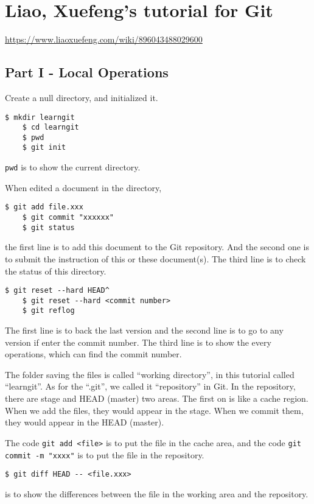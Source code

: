 \chapter{Liao, Xuefeng's tutorial for Git}
\url{https://www.liaoxuefeng.com/wiki/896043488029600}
\section{Part I - Local Operations}
Create a null directory, and initialized it.
\begin{lstlisting}[basicstyle=\small\conso]
    $ mkdir learngit
    $ cd learngit
    $ pwd
    $ git init
\end{lstlisting}
\texttt{pwd} is to show the current directory.

When edited a document in the directory, 
\begin{lstlisting}[basicstyle=\small\conso]
    $ git add file.xxx
    $ git commit "xxxxxx"
    $ git status
\end{lstlisting}
the first line is to add this document to the Git repository. 
And the second one is to submit the instruction of this or these document(s). The third line is to check the status of this directory.

\begin{lstlisting}[basicstyle=\small\conso]
    $ git reset --hard HEAD^
    $ git reset --hard <commit number>
    $ git reflog
\end{lstlisting}
The first line is to back the last version and the second line is to go to any version if enter the commit number. 
The third line is to show the every operations, which can find the commit number.

The folder saving the files is called ``working directory'', in this tutorial called ``learngit''. 
As for the ``.git'', we called it ``repository'' in Git. 
In the repository, there are stage and HEAD (master) two areas. 
The first on is like a cache region. When we add the files, they would appear in the stage. 
When we commit them, they would appear in the HEAD (master).

The code \texttt{git add <file>} is to put the file in the cache area, and the code \texttt{git commit -m "xxxx"} is to put the file in the repository.

\begin{lstlisting}[basicstyle=\small\conso]
    $ git diff HEAD -- <file.xxx>
\end{lstlisting}
is to show the differences between the file in the working area and the repository.

